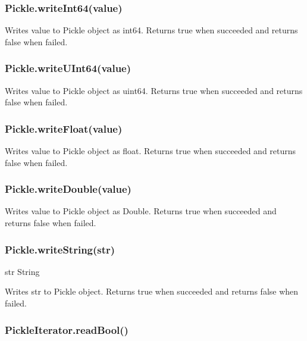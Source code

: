 \subsubsection*{Pickle.\+write\+Int64(value)}

Writes {\ttfamily value} to {\ttfamily Pickle} object as {\ttfamily int64}. Returns {\ttfamily true} when succeeded and returns {\ttfamily false} when failed.

\subsubsection*{Pickle.\+write\+U\+Int64(value)}

Writes {\ttfamily value} to {\ttfamily Pickle} object as {\ttfamily uint64}. Returns {\ttfamily true} when succeeded and returns {\ttfamily false} when failed.

\subsubsection*{Pickle.\+write\+Float(value)}

Writes {\ttfamily value} to {\ttfamily Pickle} object as {\ttfamily float}. Returns {\ttfamily true} when succeeded and returns {\ttfamily false} when failed.

\subsubsection*{Pickle.\+write\+Double(value)}

Writes {\ttfamily value} to {\ttfamily Pickle} object as {\ttfamily Double}. Returns {\ttfamily true} when succeeded and returns {\ttfamily false} when failed.

\subsubsection*{Pickle.\+write\+String(str)}


\begin{DoxyItemize}
\item {\ttfamily str} String
\end{DoxyItemize}

Writes {\ttfamily str} to {\ttfamily Pickle} object. Returns {\ttfamily true} when succeeded and returns {\ttfamily false} when failed.

\subsubsection*{Pickle\+Iterator.\+read\+Bool()}

